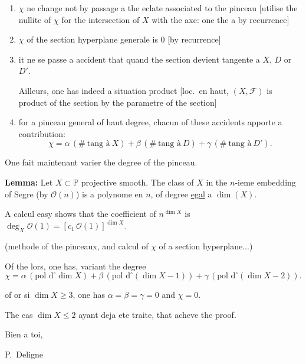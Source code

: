 \documentclass[11pt,a4paper]{article}
\theoremstyle{plain}
\theoremstyle{definition}
\begin{document}
\begin{enumerate}[label=\alph*)]
\item $\chi$ ne change not by passage a the eclate associated to the pinceau [utilise the nullite of $\chi$ for the intersection of $X$ with the axe: one the a by recurrence]

\item $\chi$ of the section hyperplane generale is $0$ [by recurrence]

\item it ne se passe a accident that quand the section devient tangente a $X$, $D$ or $D'$.

Ailleurs, one has indeed a situation product [loc.\ en haut, $(X,\mathcal{F})$ is product of the section by the parametre of the section]

\item for a pinceau general of haut degree, chacun of these accidents apporte a contribution:
\[
\chi = \alpha\,(\#~\text{tang \`a}~X) + \beta\,(\#~\text{tang \`a}~D) + \gamma\,(\#~\text{tang \`a}~D').
\]
\end{enumerate}

One fait maintenant varier the degree of the pinceau.

\vspace{0.3cm}

\noindent\textbf{Lemma:} Let $X \subset \mathbb{P}$ projective smooth. The class of $X$ in the $n$-ieme embedding of Segre (by $\mathcal{O}(n)$) is a polynome en $n$, of degree \underline{egal} a $\dim(X)$.

\vspace{0.5cm}

A calcul easy shows that the coefficient of $n^{\dim X}$ is $\deg_X \mathcal{O}(1) = [c_1\,\mathcal{O}(1)]^{\dim X}$.

(methode of the pinceaux, and calcul of $\chi$ of a section hyperplane...)

\vspace{0.5cm}

Of the lors, one has, variant the degree
\[
\chi = \alpha\,(\text{pol d}^\circ \dim X) + \beta\,(\text{pol d}^\circ (\dim X - 1)) + \gamma\,(\text{pol d}^\circ (\dim X - 2)).
\]

\vspace{0.3cm}

of or si $\dim X \geq 3$, one has $\alpha = \beta = \gamma = 0$ and $\chi = 0$.

The cas $\dim X \leq 2$ ayant deja ete traite, that acheve the proof.

\vspace{1cm}

\begin{flushright}
Bien a toi,

P.~Deligne
\end{flushright}
\end{document}

